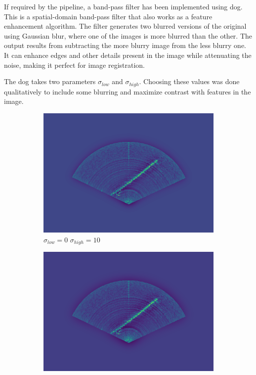 If required by the pipeline, a band-pass filter has been implemented using \acrfull{dog}. This is a spatial-domain band-pass filter that also works as a feature enhancement algorithm. The filter generates two blurred versions of the original using Gaussian blur, where one of the images is more blurred than the other. The output results from subtracting the more blurry image from the less blurry one. It can enhance edges and other details present in the image while attenuating the noise, making it perfect for image registration.

The \acrshort{dog} takes two parameters \(\sigma_{low}\) and \(\sigma_{high}\). Choosing these values was done qualitatively to include some blurring and maximize contrast with features in the image.

\begin{figure}[H]
    \centering
    \begin{subfigure}[b]{.32\textwidth}
        \centering
        \includegraphics[width=\textwidth]{figures/bandpassing/0_10.png}
        \caption{\(\sigma_{low} = 0\) \(\sigma_{high} = 10\)}
    \end{subfigure}
    \hfill
    \begin{subfigure}[b]{.32\textwidth}
        \centering
        \includegraphics[width=\textwidth]{figures/bandpassing/0_15.png}

\end{subfigure}
\end{figure}
